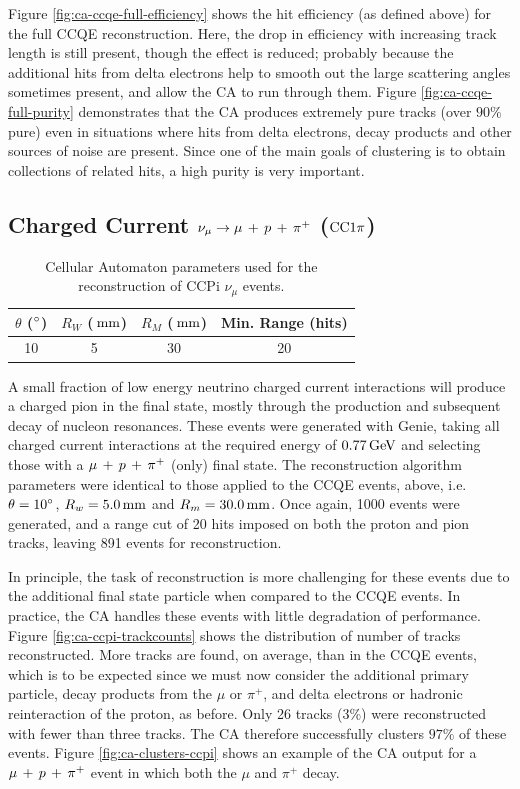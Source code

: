 Figure \ref{fig:ca-ccqe-full-efficiency} shows the hit efficiency (as defined above) for the full CCQE reconstruction. Here, the drop in efficiency with increasing track length is still present, though the effect is reduced; probably because the additional hits from delta electrons help to smooth out the large scattering angles sometimes present, and allow the \ac{CA} to run through them. Figure \ref{fig:ca-ccqe-full-purity} demonstrates that the \ac{CA} produces extremely pure tracks (over $90\%$ pure) even in situations where hits from delta electrons, decay products and other sources of noise are present. Since one of the main goals of clustering is to obtain collections of related hits, a high purity is very important.

\subsection{Charged Current \texorpdfstring{$\nu_\mu \rightarrow \mu\,+\,p\,+\,\pi^{+}$}{ν\_μ → μ + p + π⁺} (\texorpdfstring{$\mathrm{CC}1\pi$}{CC1π})}
\begin{table}[h]
    \centering
    \begin{tabular}{cccc}
        $\theta$ ($^\circ$) & $R_W$ ($\,\mathrm{mm}$) & $R_M$ ($\,\mathrm{mm}$) & Min. Range (hits) \\
        \hline
        \hline
        10 & 5 & 30 & 20 \\
        \hline
    \end{tabular}
    \caption[CA parameter set for reconstruction of \acs{CCPi} events]{\label{table:ca_params_ccpi}Cellular Automaton parameters used for the reconstruction of \acs{CCPi} $\nu_\mu$ events.}
\end{table}

A small fraction of low energy neutrino charged current interactions will produce a charged pion in the final state, mostly through the production and subsequent decay of nucleon resonances. These events were generated with Genie, taking all charged current interactions at the required energy of $0.77\,\mathrm{GeV}$ and selecting those with a $\mu\,+\,p\,+\,\pi^{+}$ (only) final state. The reconstruction algorithm parameters were identical to those applied to the \ac{CCQE} events, above, i.e. $\theta=10^\circ$, $R_w=5.0\,\mathrm{mm}$ and $R_m=30.0\,\mathrm{mm}$. Once again, 1000 events were generated, and a range cut of 20 hits imposed on both the proton and pion tracks, leaving 891 events for reconstruction.

In principle, the task of reconstruction is more challenging for these events due to the additional final state particle when compared to the CCQE events. In practice, the \ac{CA} handles these events with little degradation of performance. Figure \ref{fig:ca-ccpi-trackcounts} shows the distribution of number of tracks reconstructed. More tracks are found, on average, than in the CCQE events, which is to be expected since we must now consider the additional primary particle, decay products from the $\mu$ or $\pi^+$, and delta electrons or hadronic reinteraction of the proton, as before. Only 26 tracks ($3\%$) were reconstructed with fewer than three tracks. The \ac{CA} therefore successfully clusters $97\%$ of these events. Figure \ref{fig:ca-clusters-ccpi} shows an example of the CA output for a $\mu\,+\,p\,+\,\pi^{+}$ event in which both the $\mu$ and $\pi^+$ decay.

